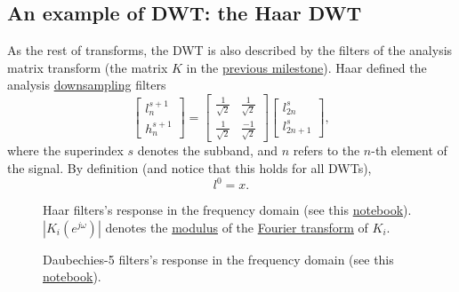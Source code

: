 \subsection{An example of DWT: the Haar DWT}
As the rest of transforms, the DWT is also described by the filters of
the analysis matrix transform (the matrix $K$ in the
\href{https://sistemas-multimedia.github.io/study_guide/06-color_transform/}{previous
  milestone}). Haar defined the analysis
\href{https://en.wikipedia.org/wiki/Downsampling_(signal_processing)}{downsampling}
filters
\begin{equation}
  \begin{bmatrix}
    l^{s+1}_n \\
    h^{s+1}_n
  \end{bmatrix}
  = 
  \begin{bmatrix} \frac{1}{\sqrt{2}} & \frac{1}{\sqrt{2}} \\ \frac{1}{\sqrt{2}} & \frac{-1}{\sqrt{2}} \end{bmatrix}
  \begin{bmatrix}
    l^s_{2n} \\
    l^s_{2n+1}
  \end{bmatrix},
  \label{eq:Haar_transform}
\end{equation}
where the superindex $s$ denotes the subband, and $n$ refers to the
$n$-th element of the signal. By definition (and notice that this
holds for all DWTs),
\begin{equation}
  l^0=x.
\end{equation}

\begin{figure}
  \centering
  \caption{Haar filters's response in the frequency domain (see this
    \href{https://github.com/Sistemas-Multimedia/Sistemas-Multimedia.github.io/blob/master/study_guide/05-DWT/dwt_filters_analysis.ipynb}{notebook}).
    $|K_i(e^{j\omega})|$ denotes the
    \href{https://en.wikipedia.org/wiki/Absolute_value}{modulus} of
    the \href{https://en.wikipedia.org/wiki/Fourier_transform}{Fourier
      transform} of $K_i$.}
  \label{fig:Haar_modulus}
\end{figure}

\begin{figure}
  \centering
  \caption{Daubechies-5 filters's response in the frequency domain
    (see this
    \href{https://github.com/Sistemas-Multimedia/Sistemas-Multimedia.github.io/blob/master/study_guide/05-DWT/dwt_filters_analysis.ipynb}{notebook}).}
  \label{fig:db5_modulus}
\end{figure}


